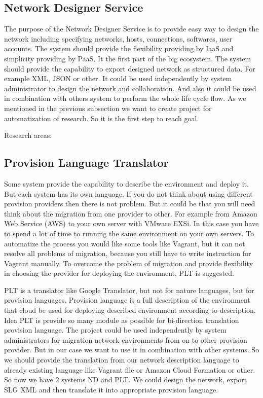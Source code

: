 \documentclass[twoside]{article}
\newcommand{\myNDS}{Network Designer Service}
\newcommand{\myPLT}{Provision Language Translator}
\begin{document}
 
\subsection{\myNDS}
The purpose of the \myNDS{ }is to provide easy way to design the network including specifying networks, hosts, connections, softwares, user accounts. The system should provide the flexibility providing by IaaS and simplicity providing by PaaS. It the first part of the big ecosystem. The system should provide the capability to export designed network as structured data. For example XML, JSON or other. It could be used independently by system administrator to design the network and collaboration. And also it could be used in combination with others system to perform the whole life cycle flow. As we mentioned in the previous subsection we want to create project for automatization of research. So it is the first step to reach goal. 

Research areas:



\subsection{\myPLT}
Some system provide the capability to describe the environment and deploy it. But each system has its own language. If you do not think about using different provision providers then there is not problem. But it could be that you will need think about the migration from one provider to other. For example from Amazon Web Service (AWS) to your own server with VMware EXSi. In this case you have to spend a lot of time to running the same environment on your own servers. To automatize the process you would like some tools like Vagrant, but it can not resolve all problems of migration, because you still have to write instruction for Vagrant manually. To overcome the problem of migration and provide flexibility in choosing the provider for deploying the environment, PLT is suggested. 

PLT is a translator like Google Translator, but not for nature languages, but for provision languages. Provision language is a full description of the environment that cloud be used for deploying described environment according to description. Idea PLT is provide so many module as possible for bi-direction translation provision language. The project could be used independently by system administrators for migration network environments from on to other provision provider. But in our case we want to use it in combination with other systems. So we should provide the translation from our network description language to already existing language like Vagrant file or Amazon Cloud Formation or other. So now we have 2 systems ND and PLT. We could design the network, export SLG XML and then translate it into appropriate provision language. 
\end{document}
